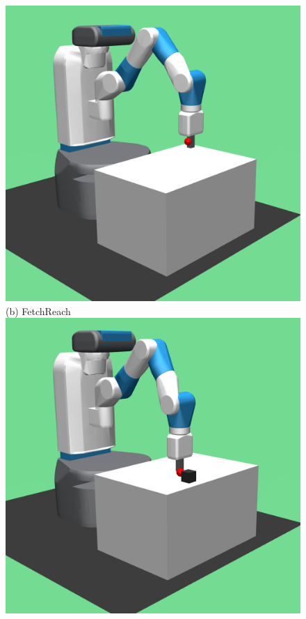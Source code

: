 \begin{figure}[t]
  \includegraphics[width=\linewidth]{figures/chapter3/reach.png}
  ({b}) FetchReach \hspace{3em}  
\endminipage\hfill
{}%
  \centering
  \includegraphics[width=\linewidth]{figures/chapter3/push.png}

\end{figure}
